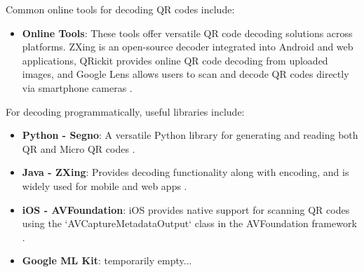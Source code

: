 Common online tools for decoding QR codes include:
\begin{itemize}
	\item \textbf{Online Tools}: These tools offer versatile QR code decoding solutions across platforms. ZXing is an open-source decoder integrated into Android and web applications, QRickit provides online QR code decoding from uploaded images, and Google Lens allows users to scan and decode QR codes directly via smartphone cameras \cite{ZXing2024, QRickit2024}.
	
\end{itemize}

For decoding programmatically, useful libraries include:
\begin{itemize}
	\item \textbf{Python - Segno}: A versatile Python library for generating and reading both QR and Micro QR codes \cite{Segno2024}.
	\item \textbf{Java - ZXing}: Provides decoding functionality along with encoding, and is widely used for mobile and web apps \cite{ZXing2024}.
	\item \textbf{iOS - AVFoundation}: iOS provides native support for scanning QR codes using the `AVCaptureMetadataOutput` class in the AVFoundation framework \cite{AVFoundation2024}.
	\item \textbf{Google ML Kit}:
	\color{red}temporarily empty...\color{black}
\end{itemize}
 
